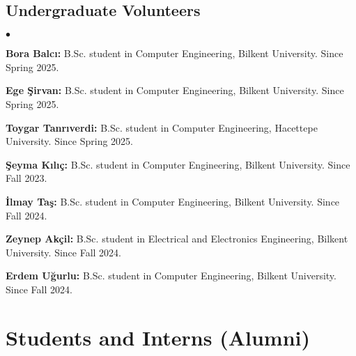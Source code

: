 \documentclass[margin,line]{res}
\newenvironment{list2}{
  \begin{list}{$\bullet$}{%
      \setlength{\itemsep}{0.1cm}
      \setlength{\parsep}{0in} \setlength{\parskip}{0in}
      \setlength{\topsep}{0in} \setlength{\partopsep}{0in} 
      \setlength{\leftmargin}{0.2in}}}{\end{list}}
\begin{document}
\begin{resume}
\vspace*{-.4cm}
  \subsection{\small \sc Undergraduate Volunteers}
  \begin{list2}
\item \textbf{Bora Balcı:} B.Sc. student in Computer Engineering,  Bilkent University. Since Spring 2025.
\item \textbf{Ege Şirvan:} B.Sc. student in Computer Engineering,  Bilkent University. Since Spring 2025.
\item \textbf{Toygar Tanrıverdi:} B.Sc. student in Computer Engineering,  Hacettepe University. Since Spring 2025.
\item {\bf Şeyma Kılıç:} B.Sc. student in Computer Engineering,  Bilkent University. Since Fall 2023.
\item  \textbf{İlmay Taş:} B.Sc. student in Computer Engineering,  Bilkent University. Since Fall 2024.
\item  \textbf{Zeynep Akçil:} B.Sc. student in Electrical and Electronics Engineering,  Bilkent University. Since Fall 2024.
\item  \textbf{Erdem Uğurlu:} B.Sc. student in Computer Engineering,  Bilkent University. Since Fall 2024.
\end{list2}

  
 

\section{\sc Students and Interns (Alumni)}
\vspace*{-.4cm}


\end{resume}
\end{document}
